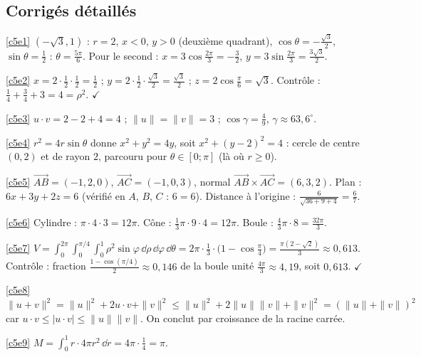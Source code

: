 \subsection{Corrigés détaillés}
\begin{corrige}{\ref{c5e1}}
$(-\sqrt3,1)$ : $r=2$, $x<0$, $y>0$ (deuxième quadrant), $\cos\theta=-\frac{\sqrt3}2$, $\sin\theta=\frac12$ : $\theta=\frac{5\pi}6$. Pour le second : $x=3\cos\frac{2\pi}3=-\frac32$, $y=3\sin\frac{2\pi}3=\frac{3\sqrt3}2$.
\end{corrige}
\begin{corrige}{\ref{c5e2}}
$x=2\cdot\frac12\cdot\frac12=\frac12$ ; $y=2\cdot\frac12\cdot\frac{\sqrt3}2=\frac{\sqrt3}2$ ; $z=2\cos\frac\pi6=\sqrt3$. Contrôle : $\frac14+\frac34+3=4=\rho^2$. $\checkmark$
\end{corrige}
\begin{corrige}{\ref{c5e3}}
$u\cdot v=2-2+4=4$ ; $\|u\|=\|v\|=3$ ; $\cos\gamma=\frac49$, $\gamma\approx63{,}6^\circ$.
\end{corrige}
\begin{corrige}{\ref{c5e4}}
$r^2=4r\sin\theta$ donne $x^2+y^2=4y$, soit $x^2+(y-2)^2=4$ : cercle de centre $(0,2)$ et de rayon $2$, parcouru pour $\theta\in[0;\pi]$ (là où $r\ge0$).
\end{corrige}
\begin{corrige}{\ref{c5e5}}
$\overrightarrow{AB}=(-1,2,0)$, $\overrightarrow{AC}=(-1,0,3)$, normal $\overrightarrow{AB}\times\overrightarrow{AC}=(6,3,2)$. Plan : $6x+3y+2z=6$ (vérifié en $A$, $B$, $C$ : $6=6$). Distance à l'origine : $\frac{6}{\sqrt{36+9+4}}=\frac67$.
\end{corrige}
\begin{corrige}{\ref{c5e6}}
Cylindre : $\pi\cdot4\cdot3=12\pi$. Cône : $\frac13\pi\cdot9\cdot4=12\pi$. Boule : $\frac43\pi\cdot8=\frac{32\pi}3$.
\end{corrige}
\begin{corrige}{\ref{c5e7}}
$V=\int_0^{2\pi}\!\!\int_0^{\pi/4}\!\!\int_0^1\rho^2\sin\varphi\,\dd\rho\,\dd\varphi\,\dd\theta=2\pi\cdot\frac13\cdot\big(1-\cos\frac\pi4\big)=\frac{\pi(2-\sqrt2)}3\approx0{,}613$. Contrôle : fraction $\frac{1-\cos(\pi/4)}2\approx0{,}146$ de la boule unité $\frac{4\pi}3\approx4{,}19$, soit $0{,}613$. $\checkmark$
\end{corrige}
\begin{corrige}{\ref{c5e8}}
$\|u+v\|^2=\|u\|^2+2u\cdot v+\|v\|^2\le\|u\|^2+2\|u\|\|v\|+\|v\|^2=(\|u\|+\|v\|)^2$ car $u\cdot v\le|u\cdot v|\le\|u\|\|v\|$. On conclut par croissance de la racine carrée.
\end{corrige}
\begin{corrige}{\ref{c5e9}}
$M=\int_0^1r\cdot4\pi r^2\,\dd r=4\pi\cdot\frac14=\pi$.
\end{corrige}
\else{}\fi


